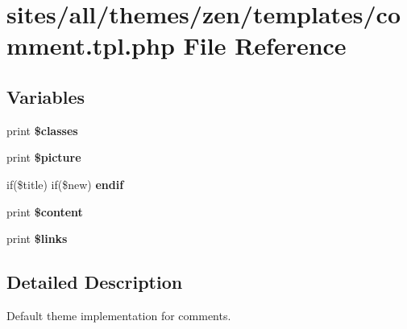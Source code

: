 \hypertarget{sites_2all_2themes_2zen_2templates_2comment_8tpl_8php}{
\section{sites/all/themes/zen/templates/comment.tpl.php File Reference}
\label{sites_2all_2themes_2zen_2templates_2comment_8tpl_8php}
}
\subsection*{Variables}
\begin{CompactItemize}
\item 
\hypertarget{sites_2all_2themes_2zen_2templates_2comment_8tpl_8php_6d48ecbdbc70ca1812e665169b5fa1e2}{
print \textbf{\$classes}}
\label{sites_2all_2themes_2zen_2templates_2comment_8tpl_8php_6d48ecbdbc70ca1812e665169b5fa1e2}

\item 
\hypertarget{sites_2all_2themes_2zen_2templates_2comment_8tpl_8php_bb12f8c31dba99f68efccffe9434082c}{
print \textbf{\$picture}}
\label{sites_2all_2themes_2zen_2templates_2comment_8tpl_8php_bb12f8c31dba99f68efccffe9434082c}

\item 
\hypertarget{sites_2all_2themes_2zen_2templates_2comment_8tpl_8php_e34e3891308810ab87f2e2b1c2a2b951}{
if(\$title) if(\$new) \textbf{endif}}
\label{sites_2all_2themes_2zen_2templates_2comment_8tpl_8php_e34e3891308810ab87f2e2b1c2a2b951}

\item 
\hypertarget{sites_2all_2themes_2zen_2templates_2comment_8tpl_8php_b7b7210f43aa78e34f0b202de894a74c}{
print \textbf{\$content}}
\label{sites_2all_2themes_2zen_2templates_2comment_8tpl_8php_b7b7210f43aa78e34f0b202de894a74c}

\item 
\hypertarget{sites_2all_2themes_2zen_2templates_2comment_8tpl_8php_67aa641b75422875f72695353fd225ca}{
print \textbf{\$links}}
\label{sites_2all_2themes_2zen_2templates_2comment_8tpl_8php_67aa641b75422875f72695353fd225ca}

\end{CompactItemize}


\subsection{Detailed Description}
Default theme implementation for comments.

